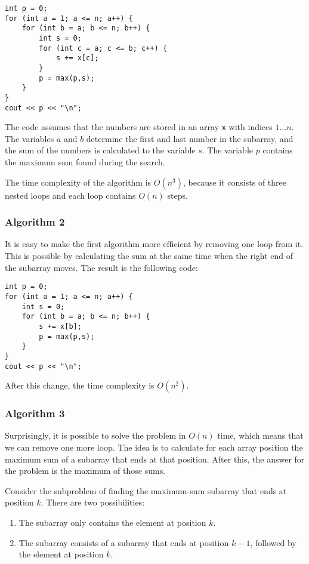 \begin{lstlisting}
int p = 0;
for (int a = 1; a <= n; a++) {
    for (int b = a; b <= n; b++) {
        int s = 0;
        for (int c = a; c <= b; c++) {
            s += x[c];
        }
        p = max(p,s);
    }
}
cout << p << "\n";
\end{lstlisting}

The code assumes that the numbers are stored in an array \texttt{x}
with indices $1 \ldots n$.
The variables $a$ and $b$ determine the first and last
number in the subarray,
and the sum of the numbers is calculated to the variable $s$.
The variable $p$ contains the maximum sum found during the search.

The time complexity of the algorithm is $O(n^3)$,
because it consists of three nested loops and
each loop contains $O(n)$ steps.

\subsubsection{Algorithm 2}

It is easy to make the first algorithm more efficient
by removing one loop from it.
This is possible by calculating the sum at the same
time when the right end of the subarray moves.
The result is the following code:

\begin{lstlisting}
int p = 0;
for (int a = 1; a <= n; a++) {
    int s = 0;
    for (int b = a; b <= n; b++) {
        s += x[b];
        p = max(p,s);
    }
}
cout << p << "\n";
\end{lstlisting}
After this change, the time complexity is $O(n^2)$.

\subsubsection{Algorithm 3}

Surprisingly, it is possible to solve the problem
in $O(n)$ time, which means that we can remove
one more loop.
The idea is to calculate for each array position
the maximum sum of a subarray that ends at that position.
After this, the answer for the problem is the
maximum of those sums.

Consider the subproblem of finding the maximum-sum subarray
that ends at position $k$.
There are two possibilities:
\begin{enumerate}
\item The subarray only contains the element at position $k$.
\item The subarray consists of a subarray that ends
at position $k-1$, followed by the element at position $k$.
\end{enumerate}

